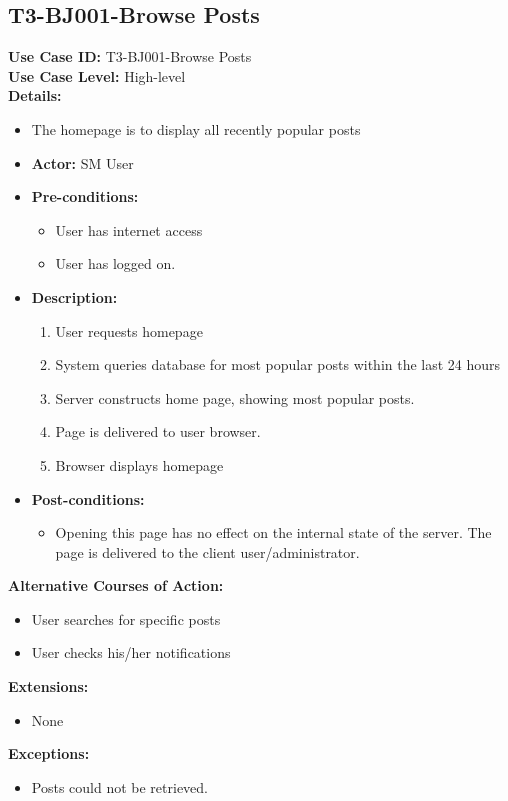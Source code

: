 \subsection{T3-BJ001-Browse Posts}
\textbf{Use Case ID:} T3-BJ001-Browse Posts\\
\textbf{Use Case Level:} High-level\\
\textbf{Details:}
\begin{itemize}
    \item The homepage is to display all recently popular posts
    \item \textbf{Actor:} SM User
    \item \textbf{Pre-conditions:}
    \begin{itemize}
        \item User has internet access
        \item User has logged on.
    \end{itemize}
    \item \textbf{Description:}
    \begin{enumerate}
        \item User requests homepage
        \item System queries database for most popular posts within the last 24 hours
        \item Server constructs home page, showing most popular posts.
        \item Page is delivered to user browser.
        \item Browser displays homepage
    \end{enumerate}
    \item \textbf{Post-conditions:}
    \begin{itemize}
        \item Opening this page has no effect on the internal state of the server. The page is delivered to the client user/administrator.
    \end{itemize}
\end{itemize}
\textbf{Alternative Courses of Action:}
\begin{itemize}
    \item User searches for specific posts
    \item User checks his/her notifications
\end{itemize}
\textbf{Extensions:}
\begin{itemize}
    \item None
\end{itemize}
\textbf{Exceptions:}
\begin{itemize}
    \item Posts could not be retrieved.
\end{itemize}
